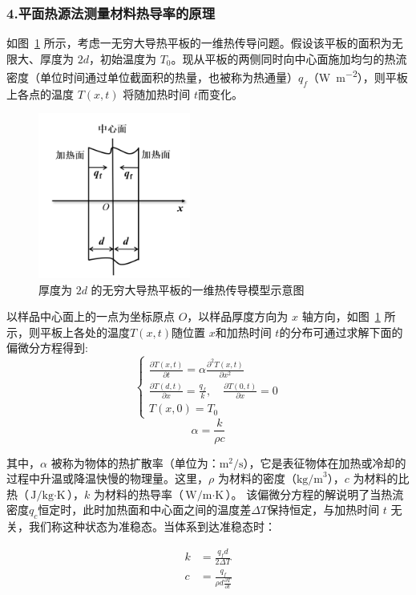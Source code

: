 \documentclass[a4paper,utf8]{article}
\newcommand{\fgref}[1]{图~\ref{#1} }
\begin{document}
        \subsubsection*{4.平面热源法测量材料热导率的原理}
            如\fgref{fg:2}所示，考虑一无穷大导热平板的一维热传导问题。假设该平板的面积为无限大、厚度为 $2d$，初始温度为 $T_0$。现从平板的两侧同时向中心面施加均匀的热流密度（单位时间通过单位截面积的热量，也被称为热通量）$q_f$（\unit{\watt\per\meter\squared}），则平板上各点的温度 $T(x,t)$ 将随加热时间 $t$而变化。
            \begin{figure}[!ht]\centering
                \includegraphics[width=50mm]{fg2.png}
                \caption{厚度为 $2d$ 的无穷大导热平板的一维热传导模型示意图 \label{fg:2}}
            \end{figure}\par
            以样品中心面上的一点为坐标原点 $O$，以样品厚度方向为 $x$ 轴方向，如\fgref{fg:2} 所示，则平板上各处的温度$T(x,t)$随位置 $x$和加热时间 $t$的分布可通过求解下面的偏微分方程得到:
            \begin{equation}
                \begin{cases}
                    \frac{\partial T(x,t)}{\partial t}=\alpha\frac{\partial^2T(x,t)}{\partial x^2}\\
                    \frac{\partial T(d,t)}{\partial x}=\frac{q_f}k ,\quad\frac{\partial T(0,t)}{\partial x}=0\\
                    T(x,0)=T_0
                \end{cases}
            \end{equation}
\[ \alpha = \frac{k}{\rho c} \]

其中，$\alpha$ 被称为物体的热扩散率（单位为：$\text{m}^2/\text{s}$），它是表征物体在加热或冷却的过程中升温或降温快慢的物理量。这里，$\rho$ 为材料的密度（$\text{kg/m}^3$），$c$ 为材料的比热（$\text{J/kg}\cdot \text{K}$），$k$ 为材料的热导率（$\text{W/m}\cdot \text{K}$）。
            该偏微分方程的解说明了当热流密度$q_c$恒定时，此时加热面和中心面之间的温度差$\varDelta T$保持恒定，与加热时间 $t$ 无关，我们称这种状态为准稳态。当体系到达准稳态时：\par
            \begin{equation}
                \begin{aligned}
                    k&=\frac{q_fd}{2\Delta T}\\
                    c&=\frac{q_f}{\rho d\frac{\partial T}{\partial t}}
                \end{aligned}
            \end{equation}
\end{document}
